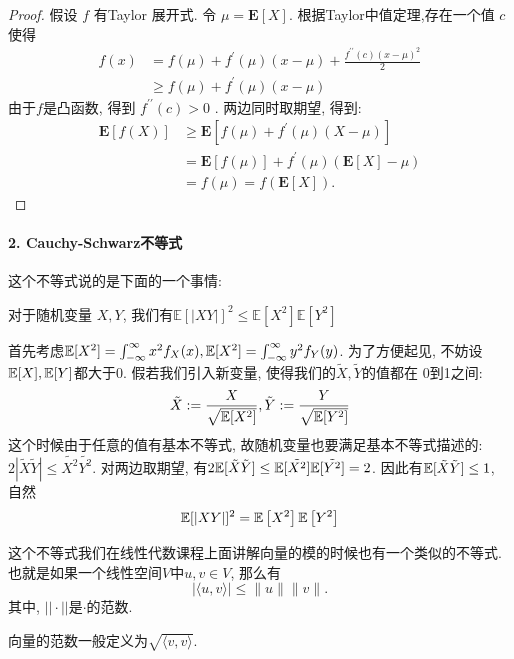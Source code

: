 \begin{proof}
    假设 $f$ 有Taylor 展开式. 令 $\mu=\mathbf{E}[X]$. 根据Taylor中值定理,存在一个值 $c$ 使得
$$
\begin{aligned}
f(x) & =f(\mu)+f^{\prime}(\mu)(x-\mu)+\frac{f^{\prime \prime}(c)(x-\mu)^2}{2} \\
& \geq f(\mu)+f^{\prime}(\mu)(x-\mu)
\end{aligned}
$$
由于$f$是凸函数, 得到 $f^{\prime \prime}(c)>0$ . 两边同时取期望, 得到: 
$$
\begin{aligned}
\mathbf{E}[f(X)] & \geq \mathbf{E}\left[f(\mu)+f^{\prime}(\mu)(X-\mu)\right] \\
& =\mathbf{E}[f(\mu)]+f^{\prime}(\mu)(\mathbf{E}[X]-\mu) \\
& =f(\mu)=f(\mathbf{E}[X]) .
\end{aligned}
$$
\end{proof}

\paragraph{2. Cauchy-Schwarz不等式}
这个不等式说的是下面的一个事情: 


对于随机变量  $ X, Y $, 我们有$ \mathbb{E}[|X Y|]^2 \leq \mathbb{E}\left[X^2\right] \mathbb{E}\left[Y^2\right]$
    
  
    
    首先考虑$\mathbb E[X^2] = \int_{-\infty}^{\infty} x^2 f_X(x), \mathbb E[X^2] = \int_{-\infty}^{\infty} y^2 f_Y(y)$. 为了方便起见, 不妨设$\mathbb E[X], \mathbb E[Y]$都大于0. 假若我们引入新变量, 使得我们的$\tilde{X}, \tilde{Y}$的值都在 0到1之间: 
    $$
    \tilde{X}:= \frac{X}{\sqrt{\mathbb E[X^2]}},\tilde{Y}:= \frac{Y}{\sqrt{\mathbb E[Y^2]}} 
    $$
    这个时候由于任意的值有基本不等式, 故随机变量也要满足基本不等式描述的: $2|\tilde{X}\tilde{Y}|\leq \tilde{X^2}\tilde{Y^2}$. 对两边取期望, 有$2\mathbb E[\tilde{X}\tilde{Y}]\leq \mathbb E[\tilde{X^2}]\mathbb E[\tilde{Y^2}]=2$. 因此有$\mathbb E[\tilde{X}\tilde{Y}]\leq 1$, 自然
    $$
        \mathbb E[|X Y|]^2 = \mathbb{E}\left[X^2\right] \mathbb{E}\left[Y^2\right]
    $$ 

    \begin{asidebox}
        这个不等式我们在线性代数课程上面讲解向量的模的时候也有一个类似的不等式. 也就是如果一个线性空间$V$中$u,v\in V$, 那么有
        $$
        |\langle u, v\rangle| \leq\|u\|\|v\|.
        $$
        其中, $||\cdot||$是$\cdot$的范数. 

        向量的范数一般定义为$\sqrt{\langle v, v\rangle}$. 
    \end{asidebox}

